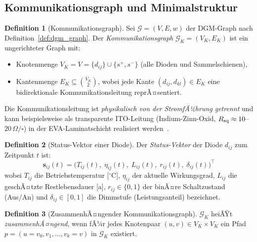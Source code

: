 ﻿\documentclass[a4paper,12pt]{article}
\theoremstyle{definition}
\newtheorem{definition}{Definition}[section]
\theoremstyle{remark}
\begin{document}
\subsection{Kommunikationsgraph und Minimalstruktur}
\label{sec:komm_graph}

\begin{definition}[Kommunikationsgraph]
\label{def:komm_graph}
Sei $\mathcal{G} = (V, E, w)$ der DGM-Graph nach Definition~\ref{def:dgm_graph}.
Der \emph{Kommunikationsgraph} $\mathcal{G}_K = (V_K, E_K)$ ist ein
ungerichteter Graph mit:
\begin{itemize}
  \item Knotenmenge $V_K = V = \{d_{ij}\} \cup \{s^+, s^-\}$ (alle Dioden
        und Sammelschienen),
  \item Kantenmenge $E_K \subseteq \binom{V_K}{2}$, wobei jede Kante
        $(d_{ij}, d_{kl}) \in E_K$ eine bidirektionale Kommunikationsleitung
        reprÃ¤sentiert.
\end{itemize}
Die Kommunikationsleitung ist \emph{physikalisch von der StromfÃ¼hrung getrennt}
und kann beispielsweise als transparente ITO-Leitung
(Indium-Zinn-Oxid, $R_{\rm sq} \approx 10$--$20\,\Omega/\square$)
in der EVA-Laminatschicht realisiert werden~\cite{Beckhoff2023}.
\end{definition}

\begin{definition}[Status-Vektor einer Diode]
\label{def:statusvektor}
Der \emph{Status-Vektor} der Diode $d_{ij}$ zum Zeitpunkt $t$ ist:
\begin{equation}
  \mathbf{s}_{ij}(t) = \bigl(T_{ij}(t),\; \eta_{ij}(t),\; L_{ij}(t),\;
                              r_{ij}(t),\; \delta_{ij}(t)\bigr)^{\!\top}
  \label{eq:statusvektor}
\end{equation}
wobei $T_{ij}$ die Betriebstemperatur [$^{\circ}$C], $\eta_{ij}$ der aktuelle
Wirkungsgrad, $L_{ij}$ die geschÃ¤tzte Restlebensdauer [a],
$r_{ij} \in \{0, 1\}$ der binÃ¤re Schaltzustand (Aus/An) und
$\delta_{ij} \in [0,1]$ die Dimmstufe (Leistungsanteil) bezeichnet.
\end{definition}

\begin{definition}[ZusammenhÃ¤ngender Kommunikationsgraph]
$\mathcal{G}_K$ heiÃŸt \emph{zusammenhÃ¤ngend}, wenn fÃ¼r jedes Knotenpaar
$(u, v) \in V_K \times V_K$ ein Pfad $p = (u = v_0, v_1, \ldots, v_k = v)$
in $\mathcal{G}_K$ existiert.
\end{definition}
\end{document}
